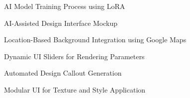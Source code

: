 \documentclass{article}
\begin{document}
\begin{figure}
    \centering
    \caption{AI Model Training Process using LoRA}
    \label{fig:ai_model_training_lora}
\end{figure}

\begin{figure}
    \centering
    \caption{AI-Assisted Design Interface Mockup}
    \label{fig:design_interface_mockup}
\end{figure}

\begin{figure}
    \centering
    \caption{Location-Based Background Integration using Google Maps}
    \label{fig:location_based_background}
\end{figure}

\begin{figure}
    \centering
    \caption{Dynamic UI Sliders for Rendering Parameters}
    \label{fig:dynamic_ui_sliders}
\end{figure}

\begin{figure}
    \centering
    \caption{Automated Design Callout Generation}
    \label{fig:automated_design_callout}
\end{figure}

\begin{figure}
    \centering
    \caption{Modular UI for Texture and Style Application}
    \label{fig:modular_ui_texture_style}
\end{figure}




\end{document}
